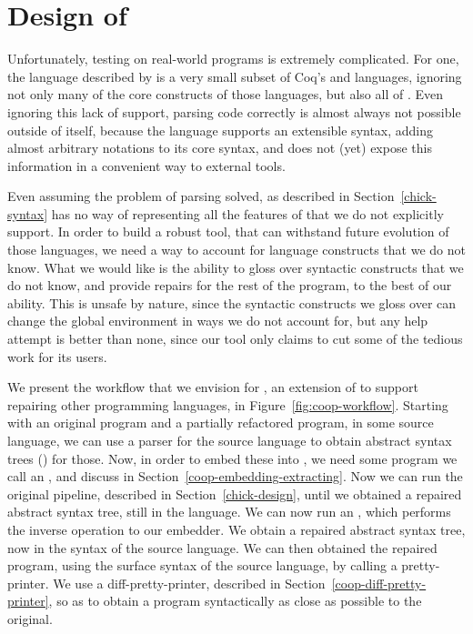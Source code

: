 \section{Design of \Coop{}}\label{coop-design}

Unfortunately, testing \Chick{} on real-world \Coq{} programs is extremely
complicated.  For one, the language described by \Chick{} is a very small subset
of Coq's \Gallina{} and \Vernacular{} languages, ignoring not only many of the
core constructs of those languages, but also all of \Ltac{}.  Even ignoring this
lack of support, parsing \Coq{} code correctly is almost always not possible
outside of \Coq{} itself, because the language supports an extensible syntax,
adding almost arbitrary notations to its core syntax, and does not (yet) expose
this information in a convenient way to external tools.

Even assuming the problem of parsing solved, \Chick{} as described in
Section~\ref{chick-syntax} has no way of representing all the features of \Coq{}
that we do not explicitly support.  In order to build a robust tool, that can
withstand future evolution of those languages, we need a way to account for
language constructs that we do not know.  What we would like is the ability to
gloss over syntactic constructs that we do not know, and provide repairs for the
rest of the program, to the best of our ability.  This is unsafe by nature,
since the syntactic constructs we gloss over can change the global environment
in ways we do not account for, but any help attempt is better than none, since
our tool only claims to cut some of the tedious work for its users.

We present the workflow that we envision for \Coop{}, an extension of \Chick{}
to support repairing other programming languages, in
Figure~\ref{fig:coop-workflow}.  Starting with an original program and a
partially refactored program, in some source language, we can use a parser for
the source language to obtain abstract syntax trees () for those.
Now, in order to embed these into \Chick{}, we need some program we call an
, and discuss in Section~\ref{coop-embedding-extracting}.  Now
we can run the original \Chick{} pipeline, described in
Section~\ref{chick-design}, until we obtained a repaired abstract syntax tree,
still in the \Chick{} language.  We can now run an , which
performs the inverse operation to our embedder.  We obtain a repaired abstract
syntax tree, now in the syntax of the source language.  We can then obtained the
repaired program, using the surface syntax of the source language, by calling a
pretty-printer.  We use a diff-pretty-printer, described in
Section~\ref{coop-diff-pretty-printer}, so as to obtain a program syntactically
as close as possible to the original.


